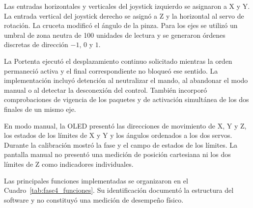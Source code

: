 Las entradas horizontales y verticales del joystick izquierdo se asignaron a X y Y. La entrada vertical del joystick derecho se asignó a Z y la horizontal al servo de rotación. La cruceta modificó el ángulo de la pinza. Para los ejes se utilizó un umbral de zona neutra de 100 unidades de lectura y se generaron órdenes discretas de dirección $-1$, $0$ y $1$.

La Portenta ejecutó el desplazamiento continuo solicitado mientras la orden permaneció activa y el final correspondiente no bloqueó ese sentido. La implementación incluyó detención al neutralizar el mando, al abandonar el modo manual o al detectar la desconexión del control. También incorporó comprobaciones de vigencia de los paquetes y de activación simultánea de los dos finales de un mismo eje.

En modo manual, la OLED presentó las direcciones de movimiento de X, Y y Z, los estados de los límites de X y Y y los ángulos ordenados a los dos servos. Durante la calibración mostró la fase y el campo de estados de los límites. La pantalla manual no presentó una medición de posición cartesiana ni los dos límites de Z como indicadores individuales.

Las principales funciones implementadas se organizaron en el Cuadro~\ref{tab:fase4_funciones}. Su identificación documentó la estructura del software y no constituyó una medición de desempeño físico.

